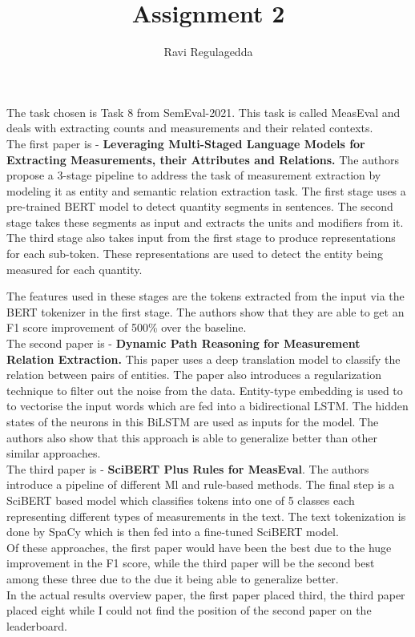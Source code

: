 \documentclass[a4]{article}
\title{Assignment 2}
\author{Ravi Regulagedda}
\date{}
\begin{document}
\maketitle
The task chosen is Task 8 from SemEval-2021. This task is called MeasEval and deals with extracting counts and measurements and their related contexts. 
\\

The first paper is \cite{karia-etal-2021-kgp} -  \textbf{Leveraging Multi-Staged Language
Models for Extracting Measurements, their Attributes and Relations.} The authors propose a 3-stage pipeline to address the task of measurement extraction by modeling it as entity and semantic relation extraction task. The first stage uses a pre-trained BERT model to detect quantity segments in sentences. The second stage takes these segments as input and extracts the units and modifiers from it. The third stage also takes input from the first stage to produce representations for each sub-token. These representations are used to detect the entity being measured for each quantity. 

The features used in these stages are the tokens extracted from the input via the BERT tokenizer in the first stage. The authors show that they are able to get an F1 score improvement of 500\% over the baseline. 
\\

The second paper is \cite{pouran-ben-veyseh-etal-2021-dpr} - \textbf{Dynamic Path Reasoning for Measurement Relation Extraction.} This paper uses a deep translation model to classify the relation between pairs of entities. The paper also introduces a regularization technique to filter out the noise from the data. Entity-type embedding is used to to vectorise the input words which are fed into a bidirectional LSTM. The hidden states of the neurons in this BiLSTM are used as inputs for the model. The authors also show that this approach is able to generalize better than other similar approaches.
\\

The third paper is \cite{therien-etal-2021-clac} - \textbf{SciBERT Plus Rules for MeasEval}. The authors introduce a pipeline of different Ml and rule-based methods. The final step is a SciBERT based model which classifies tokens into one of 5 classes each representing different types of measurements in the text. The text tokenization is done by SpaCy which is then fed into a fine-tuned SciBERT model. 
\\

Of these approaches, the first paper would have been the best due to the huge improvement in the F1 score, while the third paper will be the second best among these three due to the due it being able to generalize better.
\\

In the actual results overview paper, the first paper placed third, the third paper placed eight while I could not find the position of the second paper on the leaderboard.


\end{document}
